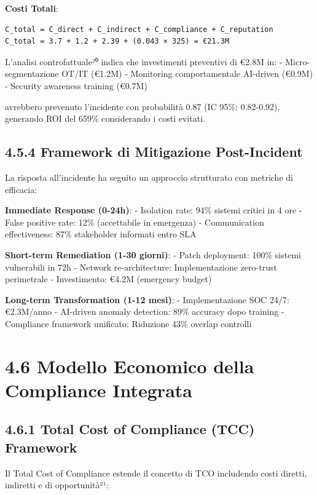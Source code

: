 \documentclass[12pt,a4paper,oneside]{book}
\numberwithin{figure}{chapter} %
\numberwithin{table}{chapter}  %
\begin{document}
\textbf{Costi Totali}:

\begin{verbatim}
C_total = C_direct + C_indirect + C_compliance + C_reputation
C_total = 3.7 + 1.2 + 2.39 + (0.043 × 325) = €21.3M
\end{verbatim}

L'analisi controfattuale²⁰ indica che investimenti preventivi di €2.8M
in: - Micro-segmentazione OT/IT (€1.2M) - Monitoring comportamentale
AI-driven (€0.9M) - Security awareness training (€0.7M)

avrebbero prevenuto l'incidente con probabilità 0.87 (IC 95\%:
0.82-0.92), generando ROI del 659\% considerando i costi evitati.

\subsection{4.5.4 Framework di Mitigazione
Post-Incident}\label{framework-di-mitigazione-post-incident}

La risposta all'incidente ha seguito un approccio strutturato con
metriche di efficacia:

\textbf{Immediate Response (0-24h)}: - Isolation rate: 94\% sistemi
critici in 4 ore - False positive rate: 12\% (accettabile in emergenza)
- Communication effectiveness: 87\% stakeholder informati entro SLA

\textbf{Short-term Remediation (1-30 giorni)}: - Patch deployment: 100\%
sistemi vulnerabili in 72h - Network re-architecture: Implementazione
zero-trust perimetrale - Investimento: €4.2M (emergency budget)

\textbf{Long-term Transformation (1-12 mesi)}: - Implementazione SOC
24/7: €2.3M/anno - AI-driven anomaly detection: 89\% accuracy dopo
training - Compliance framework unificato: Riduzione 43\% overlap
controlli

\section{4.6 Modello Economico della Compliance
Integrata}\label{modello-economico-della-compliance-integrata}

\subsection{4.6.1 Total Cost of Compliance (TCC)
Framework}\label{total-cost-of-compliance-tcc-framework}

Il Total Cost of Compliance estende il concetto di TCO includendo costi
diretti, indiretti e di opportunità²¹:
\end{document}
